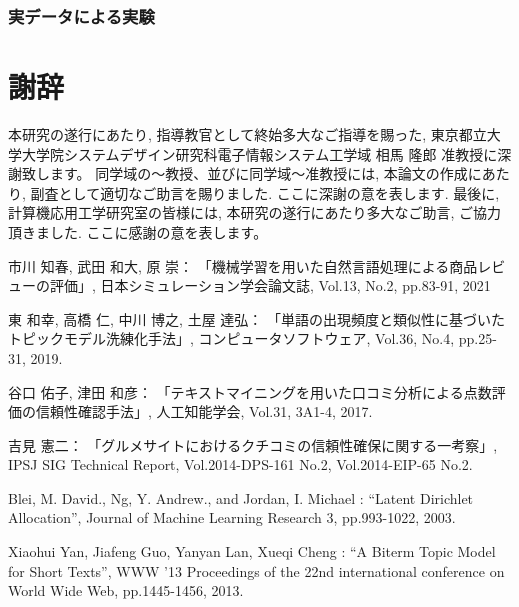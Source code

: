 \documentclass{ltjarticle}
\begin{document}
\section
{実データによる実験}













\newpage
\part*{謝辞}
本研究の遂行にあたり, 指導教官として終始多大なご指導を賜った, 
東京都立大学大学院システムデザイン研究科電子情報システム工学域 相馬 隆郎 准教授に深謝致します。
同学域の～教授、並びに同学域～准教授には, 本論文の作成にあたり, 副査として適切なご助言を賜りました. ここに深謝の意を表します. 
最後に, 計算機応用工学研究室の皆様には, 本研究の遂行にあたり多大なご助言, ご協力頂きました. ここに感謝の意を表します。

\newpage
\begin{thebibliography}{99}
    市川 知春, 武田 和大, 原 崇：
    \newblock 「機械学習を用いた自然言語処理による商品レビューの評価」, 
    \newblock 日本シミュレーション学会論文誌, Vol.13, No.2, pp.83-91, 2021

    東 和幸, 高橋 仁, 中川 博之, 土屋 達弘：
    \newblock 「単語の出現頻度と類似性に基づいたトピックモデル洗練化手法」, 
    \newblock コンピュータソフトウェア, Vol.36, No.4, pp.25-31, 2019.

    谷口 佑子, 津田 和彦：
    \newblock 「テキストマイニングを用いた口コミ分析による点数評価の信頼性確認手法」, 
    \newblock 人工知能学会, Vol.31, 3A1-4, 2017.

    吉見 憲二：
    \newblock 「グルメサイトにおけるクチコミの信頼性確保に関する一考察」, 
    \newblock IPSJ SIG Technical Report, Vol.2014-DPS-161 No.2, Vol.2014-EIP-65 No.2.   

    Blei, M. David., Ng, Y. Andrew., and Jordan, I. Michael : 
    \newblock ``Latent Dirichlet Allocation'', 
    \newblock Journal of Machine Learning Research 3, pp.993-1022, 2003.

    Xiaohui Yan, Jiafeng Guo, Yanyan Lan, Xueqi Cheng :
    \newblock ``A Biterm Topic Model for Short Texts'', 
    \newblock WWW '13 Proceedings of the 22nd international conference on World Wide Web, pp.1445-1456, 2013.

     
\end{thebibliography}
\end{document}
